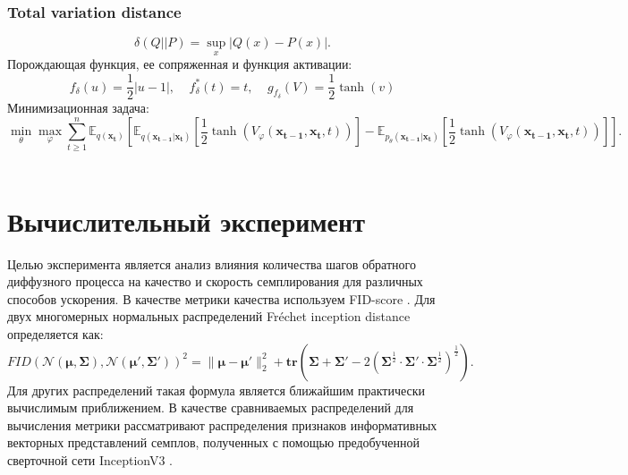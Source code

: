 \documentclass{article}
\begin{document}
\subsubsection{Total variation distance}
\begin{equation}
	\delta (Q||P) = \sup\limits_x|Q(x) - P(x)|.
\end{equation}
Порождающая функция, ее сопряженная и функция активации:
\begin{equation}
	f_{\delta}(u) = \frac{1}{2}|u-1|, ~~~~~ f^*_{\delta}(t) = t, ~~~~~ g_{f_{\delta}}(V) = \frac{1}{2}\tanh{(v)}
\end{equation}
Минимизационная задача:
\begin{equation}
	\min\limits_\theta\max\limits_\varphi\sum\limits_{t\geqslant 1}^n \mathbb{E}_{q(\mathbf{x_t})}\left[\mathbb{E}_{q(\mathbf{x_{t-1}}|\mathbf{x_t})}\left[\frac{1}{2}\tanh{(V_\varphi(\mathbf{x_{t-1}}, \mathbf{x_t}, t))}\right] - \mathbb{E}_{p_\theta(\mathbf{x_{t-1}}|\mathbf{x_t})}\left[\frac{1}{2}\tanh{(V_\varphi(\mathbf{x_{t-1}}, \mathbf{x_t}, t))}\right]\right].
\end{equation}\\



 \section{Вычислительный эксперимент}
Целью эксперимента является анализ влияния количества шагов обратного диффузного процесса на качество и скорость семплирования для различных способов ускорения. В качестве метрики качества используем FID-score \cite{https://doi.org/10.48550/arxiv.1706.08500}. Для двух многомерных нормальных распределений Fréchet inception distance определяется как:
 \begin{equation}
	FID({\mathcal {N}}(\mathbf{\mu},\mathbf{\Sigma}),{\mathcal {N}}(\mathbf{\mu} ',\mathbf{\Sigma} '))^{2}=\lVert \mathbf{\mu} -\mathbf{\mu} '\rVert _{2}^{2}+\mathbf{tr} \left(\mathbf{\Sigma} +\mathbf{\Sigma} '-2\left(\mathbf{\Sigma} ^{\frac {1}{2}}\cdot \mathbf{\Sigma} '\cdot \mathbf{\Sigma} ^{\frac {1}{2}}\right)^{\frac {1}{2}}\right).
\end{equation}
Для других распределений такая формула является ближайшим практически вычислимым приближением. В качестве сравниваемых распределений для вычисления метрики рассматривают распределения признаков информативных векторных представлений семплов, полученных с помощью предобученной сверточной сети InceptionV3 \cite{szegedy2015rethinking}.
\end{document}
